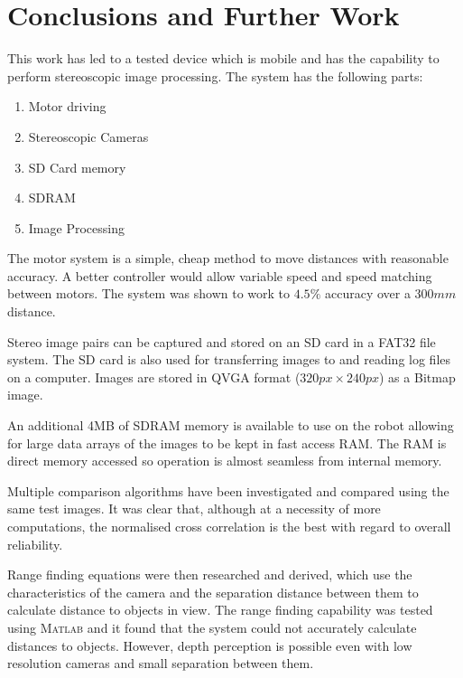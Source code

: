 \chapter{Conclusions and Further Work} \label{Chapter: Conclusions}

This work has led to a tested device which is mobile and has the capability to perform stereoscopic image processing. The system has the following parts:

\begin{enumerate}
\item Motor driving
\item Stereoscopic Cameras
\item SD Card memory
\item SDRAM
\item Image Processing
\end{enumerate} 

The motor system is a simple, cheap method to move distances with reasonable accuracy. A better controller would allow variable speed and speed matching between motors. The system was shown to work to $4.5\%$ accuracy over a $300mm$ distance.

Stereo image pairs can be captured and stored on an SD card in a FAT32 file system. The SD card is also used for transferring images to and reading log files on a computer. Images are stored in QVGA format ($320px \times 240px$) as a Bitmap image. 

An additional 4MB of SDRAM memory is available to use on the robot allowing for large data arrays of the images to be kept in fast access RAM. The RAM is direct memory accessed so operation is almost seamless from internal memory.

Multiple comparison algorithms have been investigated and compared using the same test images. It was clear that, although at a necessity of more computations, the normalised cross correlation is the best with regard to overall reliability. 

Range finding equations were then researched and derived, which use the characteristics of the camera and the separation distance between them to calculate distance to objects in view. The range finding capability was tested using \textsc{Matlab} and it found that the system could not accurately calculate distances to objects. However, depth perception is possible even with low resolution cameras and small separation between them.

